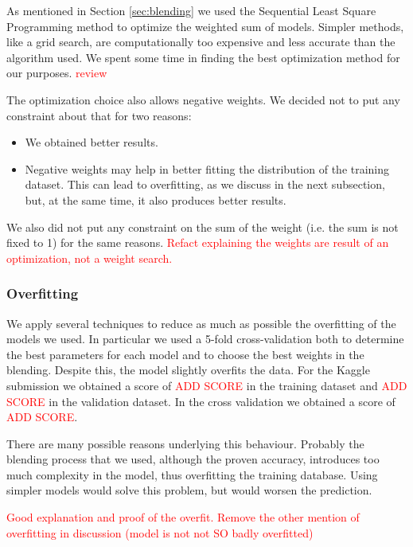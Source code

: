 \documentclass[10pt,conference,compsocconf]{IEEEtran}
\begin{document}
As mentioned in Section \ref{sec:blending} we used the Sequential Least Square Programming method to
optimize the weighted sum of models. Simpler methods, like a grid search, are computationally too
expensive and less accurate than the algorithm used. We spent some time in finding the best
optimization method for our purposes. \textcolor{red}{review}

The optimization choice also allows negative weights. We decided not to put any constraint about that
for two reasons:
\begin{itemize}
\item We obtained better results.
\item Negative weights may help in better fitting the distribution of the training dataset. This can
lead to overfitting, as we discuss in the next subsection, but, at the same time, it also produces
better results.
\end{itemize}
We also did not put any constraint on the sum of the weight (i.e. the sum is not fixed  to 1) for the
same reasons.
\textcolor{red}{Refact explaining the weights are result of an optimization, not a weight search.}

\subsubsection{Overfitting}
We apply several techniques to reduce as much as possible the overfitting of the models we used. In
particular we used a 5-fold cross-validation both to determine the best parameters for each model and to
choose the best weights in the blending.
Despite this, the model slightly overfits the data. For the Kaggle submission we obtained a score of \textcolor{red}{ADD
SCORE} in the training dataset and \textcolor{red}{ADD SCORE} in the validation dataset. 
In the cross validation we obtained a score of \textcolor{red}{ADD SCORE}.

There are many possible reasons underlying this behaviour. Probably the blending process that we
used, although the proven accuracy, introduces too much complexity in the model, thus overfitting
the training database.
Using simpler models would solve this problem, but would worsen the prediction. %

\textcolor{red}{Good explanation and proof of the overfit. Remove the other mention of overfitting in discussion (model is not not SO badly overfitted)}







\end{document}
